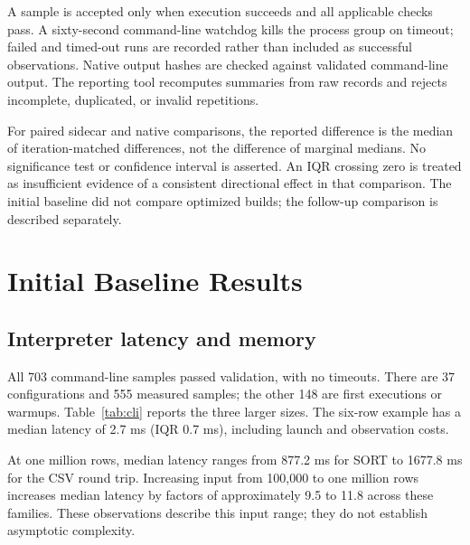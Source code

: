 \documentclass[11pt,a4paper]{article}
\begin{document}
A sample is accepted only when execution succeeds and all
applicable checks pass. A sixty-second command-line watchdog
kills the process group on timeout; failed and timed-out runs
are recorded rather than included as successful observations.
Native output hashes are checked against validated command-line
output. The reporting tool recomputes summaries from raw records
and rejects incomplete, duplicated, or invalid repetitions.

For paired sidecar and native comparisons, the reported
difference is the median of iteration-matched differences,
not the difference of marginal medians. No significance test
or confidence interval is asserted. An IQR crossing zero is
treated as insufficient evidence of a consistent directional
effect in that comparison. The initial baseline did not compare
optimized builds; the follow-up comparison is described separately.

\section{Initial Baseline Results}

\subsection{Interpreter latency and memory}

All 703 command-line samples passed validation, with no timeouts.
There are 37 configurations and 555 measured samples; the other
148 are first executions or warmups. Table~\ref{tab:cli} reports
the three larger sizes. The six-row example has a median latency
of 2.7 ms (IQR 0.7 ms), including launch and observation costs.

\begin{table}[tbp]
\centering
\small

\caption{Command-line median latency in milliseconds, with IQR
width in parentheses; fifteen measured repetitions per cell.
The last column is median peak resident memory in MiB at one
million rows. Sidecar output is disabled.}
\label{tab:cli}
\end{table}

At one million rows, median latency ranges from 877.2 ms for SORT
to 1677.8 ms for the CSV round trip. Increasing input from
100,000 to one million rows increases median latency by factors
of approximately 9.5 to 11.8 across these families. These
observations describe this input range; they do not establish
asymptotic complexity.
\end{document}
